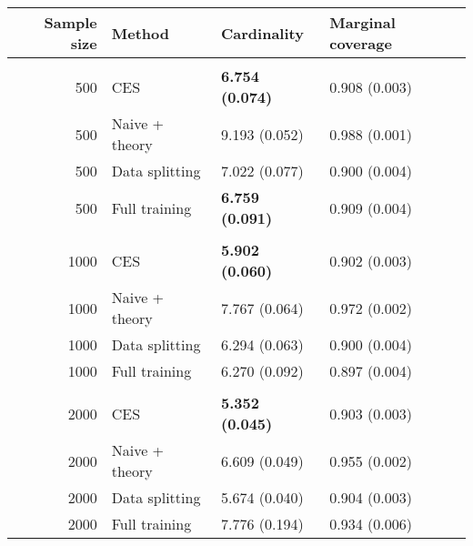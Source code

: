
\begin{tabular}{rlll}
\toprule
Sample size & Method & Cardinality & Marginal coverage\\
\midrule
\addlinespace[0.3em]
\multicolumn{4}{l}{\textbf{500}}\\
\hspace{1em}500 & CES & \textbf{6.754 (0.074)} & 0.908 (0.003)\\
\hspace{1em}500 & Naive + theory & 9.193 (0.052) & 0.988 (0.001)\\
\hspace{1em}500 & Data splitting & 7.022 (0.077) & 0.900 (0.004)\\
\hspace{1em}500 & Full training & \textbf{6.759 (0.091)} & 0.909 (0.004)\\
\addlinespace[0.3em]
\multicolumn{4}{l}{\textbf{1000}}\\
\hspace{1em}1000 & CES & \textbf{5.902 (0.060)} & 0.902 (0.003)\\
\hspace{1em}1000 & Naive + theory & 7.767 (0.064) & 0.972 (0.002)\\
\hspace{1em}1000 & Data splitting & 6.294 (0.063) & 0.900 (0.004)\\
\hspace{1em}1000 & Full training & 6.270 (0.092) & 0.897 (0.004)\\
\addlinespace[0.3em]
\multicolumn{4}{l}{\textbf{2000}}\\
\hspace{1em}2000 & CES & \textbf{5.352 (0.045)} & 0.903 (0.003)\\
\hspace{1em}2000 & Naive + theory & 6.609 (0.049) & 0.955 (0.002)\\
\hspace{1em}2000 & Data splitting & 5.674 (0.040) & 0.904 (0.003)\\
\hspace{1em}2000 & Full training & 7.776 (0.194) & 0.934 (0.006)\\
\bottomrule
\end{tabular}
